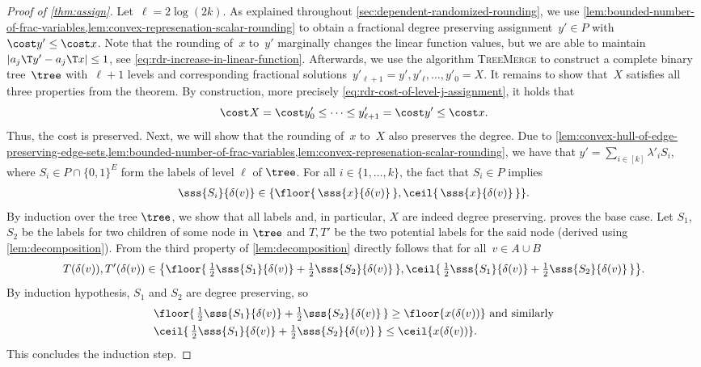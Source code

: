 \documentclass[a4paper,USenglish,cleveref,thm-restate]{lipics-v2021}
\begin{document}
\begin{proof}[Proof of \cref{thm:assign}]
    Let~$\ell = 2 \log (2k)$.
    As explained throughout \cref{sec:dependent-randomized-rounding}, we use \cref{lem:bounded-number-of-frac-variables,lem:convex-represenation-scalar-rounding} to obtain a fractional degree preserving assignment~$y'\in P$ with
    $\cost y'\le \cost x$.
    Note that the rounding of~$x$ to~$y'$ marginally changes the linear function values, but we are able to maintain~$|a_j\T y' - a_j\T x|\le 1$, see \cref{eq:rdr-increase-in-linear-function}.
    Afterwards, we use the algorithm \textsc{TreeMerge} to construct a complete binary tree~$\tree$ with~$\ell + 1$ levels
    and corresponding fractional solutions~$y'_{\ell+1} = y', y'_{\ell}, \dotsc, y'_0 = X$.
    It remains to show that~$X$ satisfies all three properties from the theorem.
    By construction, more precisely \cref{eq:rdr-cost-of-level-j-assignment}, it
    holds that
    \begin{equation*}
        \cost X = \cost y_0' \le \cdots \le y'_{\ell+1} = \cost y' \le \cost x.
    \end{equation*}
    Thus, the cost is preserved.
    Next, we will show that the rounding of~$x$ to~$X$ also preserves the degree.
    Due to \cref{lem:convex-hull-of-edge-preserving-edge-sets,lem:bounded-number-of-frac-variables,lem:convex-represenation-scalar-rounding},
    we have that $y' = \sum_{i \in [k]} \lambda'_i S_i$, where $S_i\in P\cap \{0,1\}^E$
    form the labels of level $\ell$ of $\tree$. For all $i\in\{1,\dotsc,k\}$,
    the fact that $S_i\in P$ implies
    \begin{align}
        \label{eq:rdr-degree-preservation}
        \sss{S_i}{\delta(v)} \in \{ \floor{\,\sss{x}{\delta(v)}\,}, \ceil{\, \sss{x}{\delta(v)}\,} \}.
    \end{align}
    By induction over the tree $\tree$, we show that all labels and, in particular, $X$ are indeed degree preserving.  proves the base case.
    Let $S_1$, $S_2$ be the labels for two children of some node in $\tree$
    and $T, T'$ be the two potential labels for the said node (derived using \cref{lem:decomposition}).
    From the third property of \cref{lem:decomposition} directly follows that for all~$v \in A \cup B$ 
    \begin{equation}
        \label{eq:rdr-degree-preservation-of-edge-decomposition}
        T(\delta(v)), T'(\delta(v))
        \in \big\{\floor{ \,\tfrac{1}{2}  \sss{S_{1}}{\delta(v)} + \tfrac{1}{2}\sss{S_{2}}{\delta(v)} \,}, \ceil{\,\tfrac{1}{2} \sss{S_{1}}{\delta(v)} + \tfrac{1}{2}\sss{S_{2}}{\delta(v)}\,} \big\}.
    \end{equation}
    By induction hypothesis, $S_1$ and $S_2$ are degree preserving, so
    \begin{align*}
        &\floor{ \,\tfrac{1}{2}  \sss{S_{1}}{\delta(v)} + \tfrac{1}{2}\sss{S_{2}}{\delta(v)} \,} \ge \floor{ x(\delta(v)) } \text{ and similarly} \\
        &\ceil{ \,\tfrac{1}{2}  \sss{S_{1}}{\delta(v)} + \tfrac{1}{2}\sss{S_{2}}{\delta(v)} \,} \le \ceil{ x(\delta(v)) } .
    \end{align*}
    This concludes the induction step.
    

\end{proof}
\end{document}

